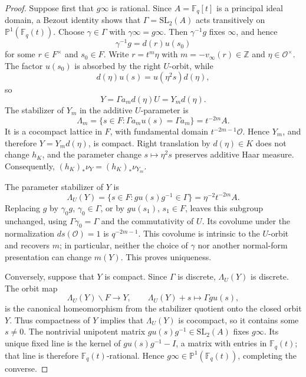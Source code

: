 \documentclass[10pt,a4paper]{amsart}
\newcommand{\Fq}{\mathbb F_q}
\newcommand{\ZZ}{\mathbb Z}
\newcommand{\cO}{\mathcal O}
\begin{document}
\begin{proof}
Suppose first that \(g\infty\) is rational.  Since \(A=\Fq[t]\) is a
principal ideal domain, a Bezout identity shows that
\(\Gamma=\mathrm{SL}_2(A)\) acts transitively on
\(\mathbb P^1(\Fq(t))\).  Choose \(\gamma\in\Gamma\) with
\(\gamma\infty=g\infty\).  Then \(\gamma^{-1}g\) fixes \(\infty\), and hence
\[
\gamma^{-1}g=d(r)u(s_0)
\]
for some \(r\in F^\times\) and \(s_0\in F\).  Write \(r=t^m\eta\) with
\(m=-v_\infty(r)\in\ZZ\) and \(\eta\in\cO^\times\).  The factor \(u(s_0)\)
is absorbed by the right \(U\)-orbit, while
\[
d(\eta)u(s)=u(\eta^2s)d(\eta),
\]
so
\[
Y=\Gamma a_m d(\eta)U=Y_m d(\eta).
\]
The stabilizer of \(Y_m\) in the additive \(U\)-parameter is
\[
\Lambda_m=\{s\in F:\Gamma a_mu(s)=\Gamma a_m\}=t^{-2m}A.
\]
It is a cocompact lattice in \(F\), with fundamental domain
\(t^{-2m-1}\cO\).  Hence \(Y_m\), and therefore \(Y=Y_md(\eta)\), is compact.
Right translation by \(d(\eta)\in K\) does not change \(h_K\), and the
parameter change \(s\mapsto\eta^2s\) preserves additive Haar measure.
Consequently,
\((h_K)_*\nu_Y=(h_K)_*\nu_{Y_m}\).

The parameter stabilizer of \(Y\) is
\[
\Lambda_U(Y)=\{s\in F:gu(s)g^{-1}\in\Gamma\}
          =\eta^{-2}t^{-2m}A.
\]
Replacing \(g\) by \(\gamma_0g\), \(\gamma_0\in\Gamma\), or by
\(gu(s_1)\), \(s_1\in F\), leaves this subgroup unchanged, using
\(\Gamma\gamma_0=\Gamma\) and the commutativity of \(U\).  Its covolume under
the normalization \(ds(\cO)=1\) is
\(q^{-2m-1}\).  This covolume is intrinsic to the \(U\)-orbit and recovers
\(m\); in particular, neither the choice of \(\gamma\) nor another normal-form
presentation can change \(m(Y)\).  This proves uniqueness.

Conversely, suppose that \(Y\) is compact.  Since \(\Gamma\) is discrete,
\(\Lambda_U(Y)\) is discrete.  The orbit map
\[
\Lambda_U(Y)\backslash F\longrightarrow Y,
\qquad \Lambda_U(Y)+s\longmapsto\Gamma gu(s),
\]
is the canonical homeomorphism from the stabilizer quotient onto the closed
orbit \(Y\).  Thus compactness of \(Y\) implies that \(\Lambda_U(Y)\) is
cocompact, so it contains some \(s\ne0\).  The nontrivial unipotent matrix
\(gu(s)g^{-1}\in\mathrm{SL}_2(A)\) fixes \(g\infty\).  Its unique fixed line
is the kernel of \(gu(s)g^{-1}-I\), a matrix with entries in \(\Fq(t)\); that
line is therefore \(\Fq(t)\)-rational.  Hence
\(g\infty\in\mathbb P^1(\Fq(t))\), completing the converse.
\end{proof}
\end{document}

